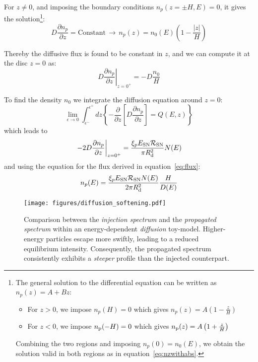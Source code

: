 For $z \ne 0$, and imposing the boundary conditions $n_p(z = \pm H, E) = 0$, it gives the solution\footnote{The general solution to the differential equation can be written as $n_p(z)=A+Bz$:
\begin{itemize}
\item For $z>0$, we impose $n_p(H)=0$ which gives $n_p(z)=A\left(1-\frac{z}{H}\right)$
\item For $z<0$, we impose $n_{\rm p}(-H)=0$ which gives $n_{\rm p}(z)=A\left(1+\frac{z}{H}\right)$
\end{itemize}
Combining the two regions and imposing $n_p(0)=n_0(E)$, we obtain the solution valid in both regions as in equation~\eqref{eq:nzwithabs}.}:
%
\begin{equation}
D \frac{\partial n_p}{\partial z} = \text{Constant} \, \longrightarrow \, n_p(z) = n_0(E) \left( 1 - \frac{|z|}{H} \right)
\label{eq:nzwithabs}
\end{equation}

Thereby the diffusive flux is found to be constant in $z$, and we can compute it at the disc $z = 0$ as:
%
\begin{equation}
\left. D \frac{\partial n_p}{\partial z}\right|_{z=0^+} = - D \frac{n_{0}}{H}
\label{eq:flux}
\end{equation}

To find the density $n_0$ we integrate the diffusion equation around $z=0$:
%
\begin{equation}
\lim_{\epsilon\rightarrow0} \int_{\epsilon^-}^{\epsilon^+} \!\!\! dz 
\left\{ -\frac{\partial}{\partial z} \left[ D \frac{\partial n_p}{\partial z} \right] = Q(E,z) \right\} 
\end{equation}
%
which leads to
%
\begin{equation}
\left. -2D \frac{\partial n_p}{\partial z}\right|_{z=0^+} = \frac{\xi_p E_{\rm SN} \mathcal R_{\rm SN}}{\pi R_{\rm d}^2} N(E) 
\end{equation}
%
and using the equation for the flux derived in equation~\eqref{eq:flux}:
%
\begin{equation}
n_p(E) = \frac{\xi_p E_{\rm SN} \mathcal R_{\rm SN} N(E)}{2 \pi R_{\rm d}^2}  \frac{H}{D(E)} 
\label{eq:protonsimplesolution}
\end{equation}

\begin{figure}[t]
\centering
\texttt{[image: figures/diffusion\_softening.pdf]}
\caption{Comparison between the \emph{injection spectrum} and the \emph{propagated spectrum} within an energy-dependent \emph{diffusion} toy-model. Higher-energy particles escape more swiftly, leading to a reduced equilibrium intensity. Consequently, the propagated spectrum consistently exhibits a \emph{steeper} profile than the injected counterpart.}
\label{fig:softening}
\end{figure}

